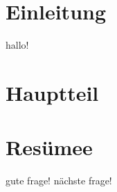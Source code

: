 \documentclass[11pt,a4paper]{article}
\begin{document}
\section{Einleitung}
hallo!

\section{Hauptteil}

\section{Resümee}

gute frage!
nächste frage!
\end{document}
